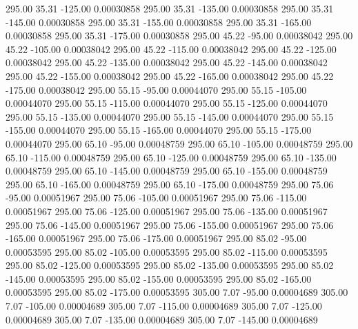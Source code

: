     295.00     35.31   -125.00     0.00030858
    295.00     35.31   -135.00     0.00030858
    295.00     35.31   -145.00     0.00030858
    295.00     35.31   -155.00     0.00030858
    295.00     35.31   -165.00     0.00030858
    295.00     35.31   -175.00     0.00030858
    295.00     45.22    -95.00     0.00038042
    295.00     45.22   -105.00     0.00038042
    295.00     45.22   -115.00     0.00038042
    295.00     45.22   -125.00     0.00038042
    295.00     45.22   -135.00     0.00038042
    295.00     45.22   -145.00     0.00038042
    295.00     45.22   -155.00     0.00038042
    295.00     45.22   -165.00     0.00038042
    295.00     45.22   -175.00     0.00038042
    295.00     55.15    -95.00     0.00044070
    295.00     55.15   -105.00     0.00044070
    295.00     55.15   -115.00     0.00044070
    295.00     55.15   -125.00     0.00044070
    295.00     55.15   -135.00     0.00044070
    295.00     55.15   -145.00     0.00044070
    295.00     55.15   -155.00     0.00044070
    295.00     55.15   -165.00     0.00044070
    295.00     55.15   -175.00     0.00044070
    295.00     65.10    -95.00     0.00048759
    295.00     65.10   -105.00     0.00048759
    295.00     65.10   -115.00     0.00048759
    295.00     65.10   -125.00     0.00048759
    295.00     65.10   -135.00     0.00048759
    295.00     65.10   -145.00     0.00048759
    295.00     65.10   -155.00     0.00048759
    295.00     65.10   -165.00     0.00048759
    295.00     65.10   -175.00     0.00048759
    295.00     75.06    -95.00     0.00051967
    295.00     75.06   -105.00     0.00051967
    295.00     75.06   -115.00     0.00051967
    295.00     75.06   -125.00     0.00051967
    295.00     75.06   -135.00     0.00051967
    295.00     75.06   -145.00     0.00051967
    295.00     75.06   -155.00     0.00051967
    295.00     75.06   -165.00     0.00051967
    295.00     75.06   -175.00     0.00051967
    295.00     85.02    -95.00     0.00053595
    295.00     85.02   -105.00     0.00053595
    295.00     85.02   -115.00     0.00053595
    295.00     85.02   -125.00     0.00053595
    295.00     85.02   -135.00     0.00053595
    295.00     85.02   -145.00     0.00053595
    295.00     85.02   -155.00     0.00053595
    295.00     85.02   -165.00     0.00053595
    295.00     85.02   -175.00     0.00053595
    305.00      7.07    -95.00     0.00004689
    305.00      7.07   -105.00     0.00004689
    305.00      7.07   -115.00     0.00004689
    305.00      7.07   -125.00     0.00004689
    305.00      7.07   -135.00     0.00004689
    305.00      7.07   -145.00     0.00004689

